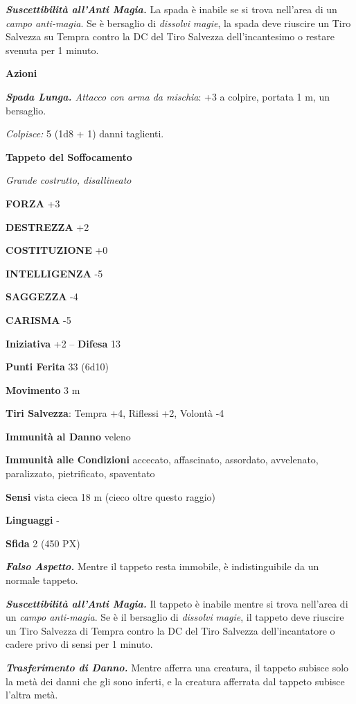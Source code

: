\begin{multicols}{2}
	\textit{\textbf{Suscettibilità all'Anti Magia.}} La spada è inabile se si trova nell'area di un \textit{campo anti-magia}. Se è bersaglio di \textit{dissolvi} \textit{magie}, la spada deve riuscire un Tiro Salvezza su Tempra contro la DC del Tiro Salvezza dell'incantesimo o restare svenuta per 1 minuto.

	\textbf{Azioni}

	\textit{\textbf{Spada Lunga.} Attacco con arma da mischia}: +3 a colpire, portata 1 m, un bersaglio.

	\textit{Colpisce:} 5 (1d8 + 1) danni taglienti.


	\medskip{}\textbf{Tappeto del Soffocamento}

	\textit{Grande costrutto, disallineato}

	\textbf{FORZA} +3

	\textbf{DESTREZZA} +2

	\textbf{COSTITUZIONE} +0

	\textbf{INTELLIGENZA} -5

	\textbf{SAGGEZZA} -4

	\textbf{CARISMA} -5

	\textbf{Iniziativa} +2 -- \textbf{Difesa} 13

	\textbf{Punti Ferita} 33 (6d10)

	\textbf{Movimento} 3 m

	\textbf{Tiri Salvezza}: Tempra +4, Riflessi +2, Volontà -4

	\textbf{Immunità al Danno} veleno

	\textbf{Immunità alle Condizioni} accecato, affascinato, assordato, avvelenato, paralizzato, pietrificato, spaventato

	\textbf{Sensi} vista cieca 18 m (cieco oltre questo raggio)

	\textbf{Linguaggi} -

	\textbf{Sfida} 2 (450 PX)

	\textit{\textbf{Falso Aspetto.}} Mentre il tappeto resta immobile, è indistinguibile da un normale tappeto.

	\textit{\textbf{Suscettibilità all'Anti Magia.}} Il tappeto è inabile mentre si trova nell'area di un \textit{campo anti-magia}. Se è il bersaglio di \textit{dissolvi} \textit{magie}, il tappeto deve riuscire un Tiro Salvezza di Tempra contro la DC del Tiro Salvezza dell'incantatore o cadere privo di sensi per 1 minuto.

	\textit{\textbf{Trasferimento di Danno.}} Mentre afferra una creatura, il tappeto subisce solo la metà dei danni che gli sono inferti, e la creatura afferrata dal tappeto subisce l'altra metà.


\end{multicols}
